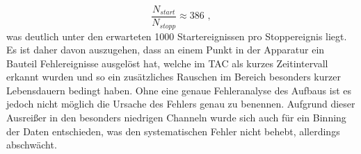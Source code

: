 \begin{equation}
    \frac{N_{start}}{N_{stopp}} \approx 386 \, \, ,
\end{equation}
was deutlich unter den erwarteten 1000 Startereignissen pro Stoppereignis liegt. Es ist daher davon auszugehen, dass an einem Punkt in der Apparatur ein Bauteil Fehlereignisse ausgelöst hat, welche im TAC als kurzes Zeitintervall erkannt wurden und so ein zusätzliches Rauschen im Bereich besonders kurzer Lebensdauern bedingt haben.
Ohne eine genaue Fehleranalyse des Aufbaus ist es jedoch nicht möglich die Ursache des Fehlers genau zu benennen. Aufgrund dieser Ausreißer in den besonders niedrigen Channeln wurde sich auch für ein Binning der Daten entschieden, was den systematischen Fehler nicht behebt, allerdings abschwächt.

\newpage